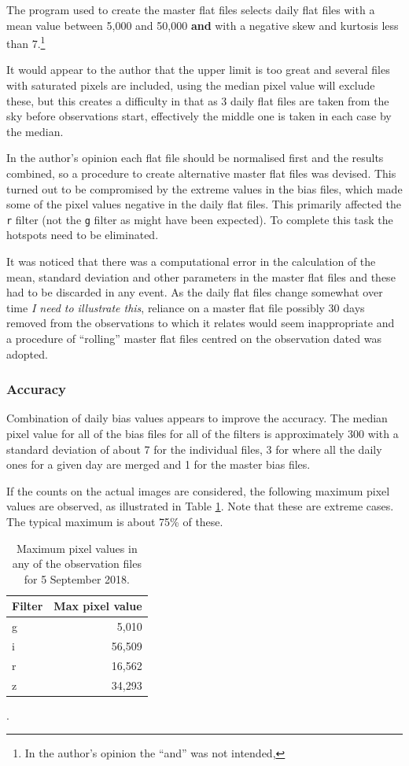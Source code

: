 The program used to create the master flat files selects daily flat files with a
mean value between 5,000 and 50,000 \textbf{and} with a negative skew and
kurtosis less than 7.\footnote{In the author's opinion the ``and'' was not
intended,}

It would appear to the author that the upper limit is too great and several
files with saturated pixels are included, using the median pixel value will
exclude these, but this creates a difficulty in that as 3 daily flat files are
taken from the sky before observations start, effectively the middle one is
taken in each case by the median.

In the author's opinion each flat file should
be normalised first and the results combined, so a procedure to create
alternative master flat files was devised. This turned out to be compromised by
the extreme values in the bias files, which made some of the pixel values
negative in the daily flat files. This primarily affected the \texttt{r} filter
(not the \texttt{g} filter as might have been expected). To complete this task
the hotspots need to be eliminated.

It was noticed that there was a computational error in the calculation of the
mean, standard deviation and other parameters in the master flat files and these
had to be discarded in any event. As the daily flat files change somewhat over
time \textit{I need to illustrate this}, reliance on a master flat file possibly
30 days removed from the observations to which it relates would seem
inappropriate and a procedure of ``rolling'' master flat files centred on the
observation dated was adopted.

\subsubsection{Accuracy}
Combination of daily bias values appears to improve the accuracy. The median
pixel value for all of the bias files for all of the filters is approximately
300 with a standard deviation of about 7 for the individual files, 3 for where
all the daily ones for a given day are merged and 1 for the master bias files.

If the counts on the actual images are considered, the following maximum pixel
values are observed, as illustrated in Table \ref{table:pmaxima}. Note that
these are extreme cases. The typical maximum is about 75\% of these.

\begin{table}[!htbp]
\begin{center}
\begin{tabular}{lr} \hline
Filter & Max pixel value \\\hline
g & 5,010 \\
i & 56,509 \\
r & 16,562 \\
z & 34,293 \\
\hline
\end{tabular}
\end{center}
\caption{Maximum pixel values in any of the observation files for 5 September
2018.}.
\protect\label{table:pmaxima}
\end{table}
\clearpage

